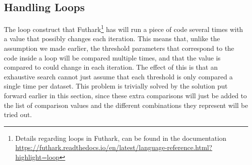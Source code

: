 \subsection{Handling Loops}
The loop construct that Futhark\footnote{Details regarding loops in Futhark, can be found in the documentation \url{https://futhark.readthedocs.io/en/latest/language-reference.html?highlight=loop}} has will run a piece of code several times with
a value that possibly changes each iteration. This means that, unlike the
assumption we made earlier, the threshold
parameters that correspond to the code inside a loop will be compared multiple
times, and that the value is compared to could change in each iteration. The
effect of this is that an exhaustive search cannot just assume that each
threshold is only compared a single time per dataset. This problem is
trivially solved by the solution put forward earlier in this section, since
these extra comparisons will just be added to the list of comparison values and
the different combinations they represent will be tried out.
